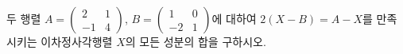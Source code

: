 \hspace*{2mm}\begin{minipage}[t]{\dimexpr\linewidth-2mm\relax}\vspace{0pt}
두 행렬 $A=\begin{pmatrix} 2 & 1 \\ -1 & 4 \end{pmatrix}$, $B=\begin{pmatrix} 1 & 0 \\ -2 & 1 \end{pmatrix}$에 대하여 $2(X-B)=A-X$를 만족시키는 이차정사각행렬 $X$의 모든 성분의 합을 구하시오.\end{minipage}
